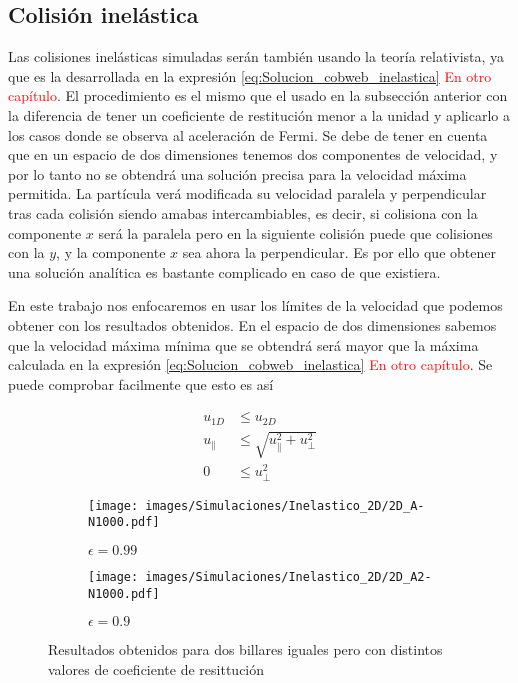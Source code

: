 \documentclass[11pt, spanish]{book}
\begin{document}
\subsection{Colisión inelástica}

Las colisiones inelásticas simuladas serán también usando la teoría relativista, ya que es la desarrollada en la expresión \ref{eq:Solucion_cobweb_inelastica} \textcolor{red}{En otro capítulo}. El procedimiento es el mismo que el usado en la subsección anterior con la diferencia de tener un coeficiente de restitución menor a la unidad y aplicarlo a los casos donde se observa al aceleración de Fermi. Se debe de tener en cuenta que en un espacio de dos dimensiones tenemos dos componentes de velocidad, y por lo tanto no se obtendrá una solución precisa para la velocidad máxima permitida. La partícula verá modificada su velocidad paralela y perpendicular tras cada colisión siendo amabas intercambiables, es decir, si colisiona con la componente \( x \) será la paralela pero en la siguiente colisión puede que colisiones con la \( y \), y la componente \( x \) sea ahora la perpendicular. Es por ello que obtener una solución analítica es bastante complicado en caso de que existiera. 

\vspace{3mm}

En este trabajo nos enfocaremos en usar los límites de la velocidad que podemos obtener con los resultados obtenidos. En el espacio de dos dimensiones sabemos que la velocidad máxima mínima que se obtendrá será mayor que la máxima calculada en la expresión \ref{eq:Solucion_cobweb_inelastica} \textcolor{red}{En otro capítulo}. Se puede comprobar facilmente que esto es así

\begin{align}
    u_{1D} &\leq u_{2D} \nonumber\\
    u_{\parallel} &\leq \sqrt{u_\parallel^2 + u_\perp^2}\\
     0 &\leq u_\perp^2 \nonumber
\end{align}

\begin{figure}[H]
    \begin{subfigure}[b]{0.5\textwidth}
        \centering
        \texttt{[image: images/Simulaciones/Inelastico\_2D/2D\_A-N1000.pdf]}
        \caption{\( \epsilon = 0.99 \)}
    \end{subfigure}
    \hfill
    \begin{subfigure}[b]{0.5\textwidth}
        \centering
        \texttt{[image: images/Simulaciones/Inelastico\_2D/2D\_A2-N1000.pdf]}
        \caption{\( \epsilon = 0.9 \)}
    \end{subfigure}
    \caption{Resultados obtenidos para dos billares iguales pero con distintos valores de coeficiente de resittución}
    \label{fig:2DR_A-N1000_Ine}
\end{figure}
\end{document}
